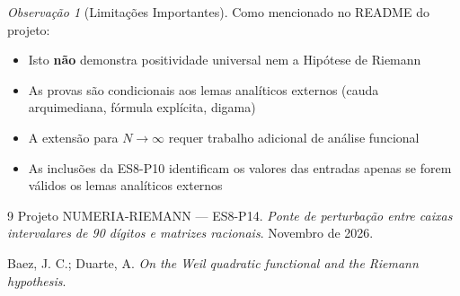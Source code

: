 \documentclass[12pt,a4paper]{article}
\theoremstyle{plain}
\theoremstyle{definition}
\theoremstyle{remark}
\newtheorem{observacao}{Observação}
\begin{document}
\begin{observacao}[Limitações Importantes]
Como mencionado no README do projeto:
\begin{itemize}
    \item Isto \textbf{não} demonstra positividade universal nem a Hipótese de Riemann
    \item As provas são condicionais aos lemas analíticos externos (cauda arquimediana, fórmula explícita, digama)
    \item A extensão para $N \to \infty$ requer trabalho adicional de análise funcional
    \item As inclusões da ES8-P10 identificam os valores das entradas apenas se forem válidos os lemas analíticos externos
\end{itemize}
\end{observacao}

\begin{thebibliography}{9}
Projeto NUMERIA-RIEMANN — ES8-P14. \emph{Ponte de perturbação entre caixas intervalares de 90 dígitos e matrizes racionais}. Novembro de 2026.

Baez, J. C.; Duarte, A. \emph{On the Weil quadratic functional and the Riemann hypothesis}.
\end{thebibliography}
\end{document}
